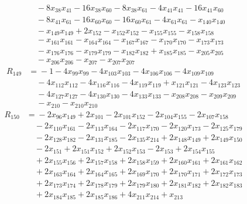 \begin{align*}
&\quad{}-8x_{38}x_{41} -16x_{38}x_{60} -8x_{38}x_{61} -4x_{41}x_{41} -16x_{41}x_{60}\\
&\quad{}-8x_{41}x_{61} -16x_{60}x_{60} -16x_{60}x_{61} -4x_{61}x_{61} -x_{140}x_{140}\\
&\quad{}-x_{149}x_{149} +2x_{152} -x_{152}x_{152} -x_{155}x_{155} -x_{158}x_{158}\\
&\quad{}-x_{161}x_{161} -x_{164}x_{164} -x_{167}x_{167} -x_{170}x_{170} -x_{173}x_{173}\\
&\quad{}-x_{176}x_{176} -x_{179}x_{179} -x_{182}x_{182} +x_{185}x_{185} -x_{205}x_{205}\\
&\quad{}-x_{206}x_{206} -x_{207} -x_{207}x_{207}
\end{align*}
\begin{align*}
R_{149}&={}-1 -4x_{99}x_{99} -4x_{103}x_{103} -4x_{106}x_{106} -4x_{109}x_{109}\\
&\quad{}-4x_{112}x_{112} -4x_{116}x_{116} -4x_{119}x_{119} +x_{121}x_{121} -4x_{123}x_{123}\\
&\quad{}-4x_{127}x_{127} -4x_{130}x_{130} -4x_{133}x_{133} -x_{208}x_{208} -x_{209}x_{209}\\
&\quad{}-x_{210} -x_{210}x_{210}
\end{align*}
\begin{align*}
R_{150}&={}-2x_{96}x_{149} +2x_{101} -2x_{101}x_{152} -2x_{104}x_{155} -2x_{107}x_{158}\\
&\quad{}-2x_{110}x_{161} -2x_{113}x_{164} -2x_{117}x_{170} -2x_{120}x_{173} -2x_{125}x_{179}\\
&\quad{}-2x_{128}x_{182} -2x_{131}x_{185} -2x_{135}x_{214} +2x_{148}x_{149} +2x_{149}x_{150}\\
&\quad{}-2x_{151} +2x_{151}x_{152} +2x_{152}x_{153} -2x_{153} +2x_{154}x_{155}\\
&\quad{}+2x_{155}x_{156} +2x_{157}x_{158} +2x_{158}x_{159} +2x_{160}x_{161} +2x_{161}x_{162}\\
&\quad{}+2x_{163}x_{164} +2x_{164}x_{165} +2x_{169}x_{170} +2x_{170}x_{171} +2x_{172}x_{173}\\
&\quad{}+2x_{173}x_{174} +2x_{178}x_{179} +2x_{179}x_{180} +2x_{181}x_{182} +2x_{182}x_{183}\\
&\quad{}+2x_{184}x_{185} +2x_{185}x_{186} +4x_{211}x_{214} +x_{213}
\end{align*}
